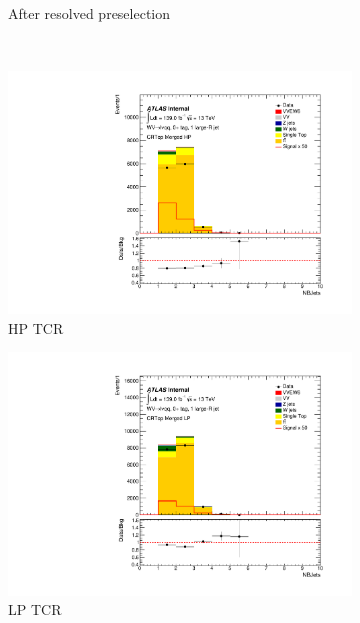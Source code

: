 \begin{figure}[ht]
\begin{subfigure}{0.32\textwidth}
        \caption{After resolved preselection}
    \end{subfigure}\\
    \begin{subfigure}{0.32\textwidth}
        \includegraphics[width=\linewidth]{figures/CRPlots/CRTop_50/stacked_plot_NBJets.pdf}
        \caption{HP TCR}
    \end{subfigure}
    \begin{subfigure}{0.32\textwidth}
        \includegraphics[width=\linewidth]{figures/CRPlots/CRTop_80/stacked_plot_NBJets.pdf}
        \caption{LP TCR}
    \end{subfigure}
    \begin{subfigure}{0.32\textwidth}

\end{subfigure}
\end{figure}
